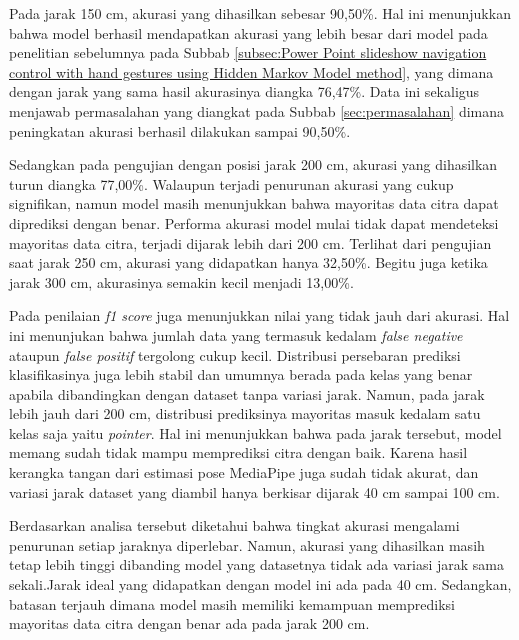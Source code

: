 Pada jarak 150 cm, akurasi yang dihasilkan sebesar 90,50\%. Hal ini menunjukkan bahwa model berhasil mendapatkan akurasi yang lebih besar dari model pada penelitian sebelumnya pada Subbab \ref{subsec:Power Point slideshow navigation control with hand gestures using Hidden Markov Model method}, yang dimana dengan jarak yang sama hasil akurasinya diangka 76,47\%. Data ini sekaligus menjawab permasalahan yang diangkat pada Subbab \ref{sec:permasalahan} dimana peningkatan akurasi berhasil dilakukan sampai 90,50\%.

Sedangkan pada pengujian dengan posisi jarak 200 cm, akurasi yang dihasilkan turun diangka 77,00\%. Walaupun terjadi penurunan akurasi yang cukup signifikan, namun model masih menunjukkan bahwa mayoritas data citra dapat diprediksi dengan benar. Performa akurasi model mulai tidak dapat mendeteksi mayoritas data citra, terjadi dijarak lebih dari 200 cm. Terlihat dari pengujian saat jarak 250 cm, akurasi yang didapatkan hanya 32,50\%. Begitu juga ketika jarak 300 cm, akurasinya semakin kecil menjadi 13,00\%.

Pada penilaian \emph{f1 score} juga menunjukkan nilai yang tidak jauh dari akurasi. Hal ini menunjukan bahwa jumlah data yang termasuk kedalam \emph{false negative} ataupun \emph{false positif} tergolong cukup kecil. Distribusi persebaran prediksi klasifikasinya juga lebih stabil dan umumnya berada pada kelas yang benar apabila dibandingkan dengan dataset tanpa variasi jarak. Namun, pada jarak lebih jauh dari 200 cm, distribusi prediksinya mayoritas masuk kedalam satu kelas saja yaitu \emph{pointer}. Hal ini menunjukkan bahwa pada jarak tersebut, model memang sudah tidak mampu memprediksi citra dengan baik. Karena hasil kerangka tangan dari estimasi pose MediaPipe juga sudah tidak akurat, dan variasi jarak dataset yang diambil hanya berkisar dijarak 40 cm sampai 100 cm.  

Berdasarkan analisa tersebut diketahui bahwa tingkat akurasi mengalami penurunan setiap jaraknya diperlebar. Namun, akurasi yang dihasilkan masih tetap lebih tinggi dibanding model yang datasetnya tidak ada variasi jarak sama sekali.Jarak ideal yang didapatkan dengan model ini ada pada 40 cm. Sedangkan, batasan terjauh dimana model masih memiliki kemampuan memprediksi mayoritas data citra dengan benar ada pada jarak 200 cm.  


